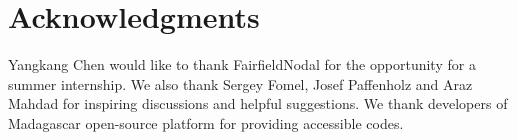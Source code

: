 \section{Acknowledgments}
Yangkang Chen would like to thank FairfieldNodal for the opportunity for a summer internship. We also thank Sergey Fomel, Josef Paffenholz and Araz Mahdad for inspiring discussions and helpful suggestions. We  thank developers of Madagascar open-source platform for providing accessible codes.










